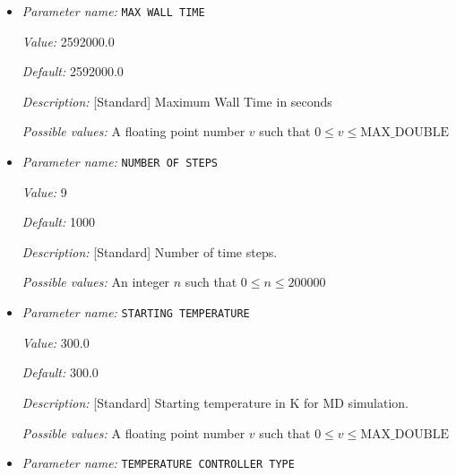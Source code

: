 \begin{itemize}
{\it Value:} 1.5


{\it Default:} 1.5


{\it Description:} [Developer] Maximum scaling factor for maximum jacobian ratio of FEM mesh when mesh is deformed.


{\it Possible values:} A floating point number $v$ such that $0.9 \leq v \leq 3$
\item {\it Parameter name:} {\tt MAX WALL TIME}
\label{parameters:Molecular Dynamics/MAX WALL TIME}
\label{parameters:Molecular_20Dynamics/MAX_20WALL_20TIME}


{\it Value:} 2592000.0


{\it Default:} 2592000.0


{\it Description:} [Standard] Maximum Wall Time in seconds


{\it Possible values:} A floating point number $v$ such that $0 \leq v \leq \text{MAX\_DOUBLE}$
\item {\it Parameter name:} {\tt NUMBER OF STEPS}
\label{parameters:Molecular Dynamics/NUMBER OF STEPS}
\label{parameters:Molecular_20Dynamics/NUMBER_20OF_20STEPS}


{\it Value:} 9


{\it Default:} 1000


{\it Description:} [Standard] Number of time steps.


{\it Possible values:} An integer $n$ such that $0\leq n \leq 200000$
\item {\it Parameter name:} {\tt STARTING TEMPERATURE}
\label{parameters:Molecular Dynamics/STARTING TEMPERATURE}
\label{parameters:Molecular_20Dynamics/STARTING_20TEMPERATURE}


{\it Value:} 300.0


{\it Default:} 300.0


{\it Description:} [Standard] Starting temperature in K for MD simulation.


{\it Possible values:} A floating point number $v$ such that $0 \leq v \leq \text{MAX\_DOUBLE}$
\item {\it Parameter name:} {\tt TEMPERATURE CONTROLLER TYPE}
\label{parameters:Molecular Dynamics/TEMPERATURE CONTROLLER TYPE}
\label{parameters:Molecular_20Dynamics/TEMPERATURE_20CONTROLLER_20TYPE}



\end{itemize}
